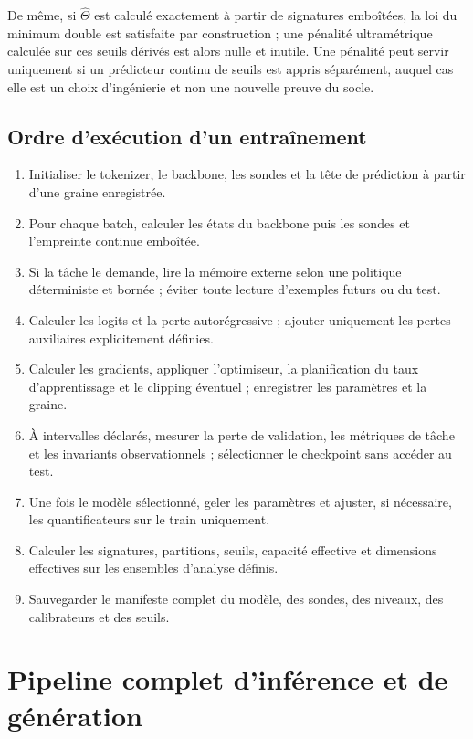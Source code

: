 \documentclass[11pt,a4paper]{article}
\theoremstyle{remark}
\begin{document}
De même, si $\widehat\Theta$ est calculé exactement à partir de signatures emboîtées, la loi du minimum double est satisfaite par construction ; une pénalité ultramétrique calculée sur ces seuils dérivés est alors nulle et inutile. Une pénalité peut servir uniquement si un prédicteur continu de seuils est appris séparément, auquel cas elle est un choix d'ingénierie et non une nouvelle preuve du socle.

\subsection{Ordre d'exécution d'un entraînement}
\begin{enumerate}[label=\textbf{T\arabic*.}]
  \item Initialiser le tokenizer, le backbone, les sondes et la tête de prédiction à partir d'une graine enregistrée.
  \item Pour chaque batch, calculer les états du backbone puis les sondes et l'empreinte continue emboîtée.
  \item Si la tâche le demande, lire la mémoire externe selon une politique déterministe et bornée ; éviter toute lecture d'exemples futurs ou du test.
  \item Calculer les logits et la perte autorégressive ; ajouter uniquement les pertes auxiliaires explicitement définies.
  \item Calculer les gradients, appliquer l'optimiseur, la planification du taux d'apprentissage et le clipping éventuel ; enregistrer les paramètres et la graine.
  \item À intervalles déclarés, mesurer la perte de validation, les métriques de tâche et les invariants observationnels ; sélectionner le checkpoint sans accéder au test.
  \item Une fois le modèle sélectionné, geler les paramètres et ajuster, si nécessaire, les quantificateurs sur le train uniquement.
  \item Calculer les signatures, partitions, seuils, capacité effective et dimensions effectives sur les ensembles d'analyse définis.
  \item Sauvegarder le manifeste complet du modèle, des sondes, des niveaux, des calibrateurs et des seuils.
\end{enumerate}

\section{Pipeline complet d'inférence et de génération}
\end{document}
